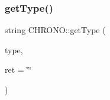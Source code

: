 \mbox{\label{namespace_c_h_r_o_n_o_ae2a3e41f8bf5f83ba84d3f4d2eed3836}} 
\subsubsection{\texorpdfstring{getType()}{getType()}}
{\footnotesize\ttfamily string C\+H\+R\+O\+N\+O\+::get\+Type (\begin{DoxyParamCaption}\item[{\mbox{\hyperlink{namespace_c_h_r_o_n_o_a246e471488a6e6b17ddb86e3b817c7d9}{T\+I\+M\+E\+\_\+\+T\+Y\+PE}}}]{type,  }\item[{string}]{ret = {\ttfamily \char`\"{}\char`\"{}} }\end{DoxyParamCaption})\hspace{0.3cm}{\ttfamily [inline]}}

